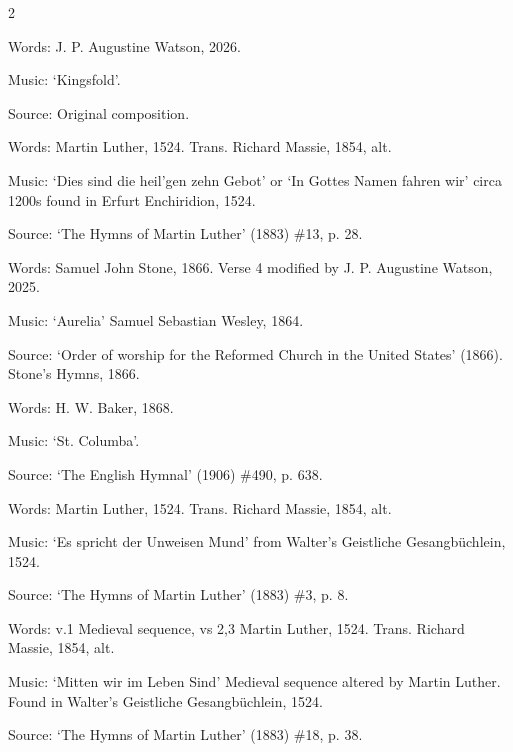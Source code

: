 \begin{multicols}{2}
\par\noindent
Words: J. P. Augustine Watson, 2026. 
\par\noindent
Music: `Kingsfold'.
\par\noindent
Source: Original composition.


\par\noindent
Words: Martin Luther, 1524. Trans. Richard Massie, 1854, alt. 
\par\noindent
Music: `Dies sind die heil'gen zehn Gebot' or `In Gottes Namen fahren wir' circa 1200s found in Erfurt Enchiridion, 1524.
\par\noindent
Source: `The Hymns of Martin Luther' (1883) \#13, p. 28.


\par\noindent
Words: Samuel John Stone, 1866. Verse 4 modified by J. P. Augustine Watson, 2025.
\par\noindent
Music: `Aurelia' Samuel Sebastian Wesley, 1864.
\par\noindent
Source: `Order of worship for the Reformed Church in the United States' (1866). Stone's Hymns, 1866.


\par\noindent
Words: H. W. Baker, 1868.
\par\noindent
Music: `St. Columba'.
\par\noindent
Source: `The English Hymnal' (1906) \#490, p. 638.


\newcolumn

\par\noindent
Words: Martin Luther, 1524. Trans. Richard Massie, 1854, alt. 
\par\noindent
Music: `Es spricht der Unweisen Mund' from Walter's Geistliche Gesangbüchlein, 1524.
\par\noindent
Source: `The Hymns of Martin Luther' (1883) \#3, p. 8.


\par\noindent
Words: v.1 Medieval sequence, vs 2,3 Martin Luther, 1524.  Trans. Richard Massie, 1854, alt. 
\par\noindent
Music: `Mitten wir im Leben Sind' Medieval sequence altered by Martin Luther. Found in Walter's Geistliche Gesangbüchlein, 1524.
\par\noindent
Source: `The Hymns of Martin Luther' (1883) \#18, p. 38.



\end{multicols}
